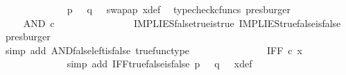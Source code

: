 \begin{isabellebody}
\ \ \ \ \ \ \ \ \ \ \ \ \isamarkupfalse%
\ {\isacartoucheopen}p\ {\isacharequal}{\kern0pt}\ {\isasymt}{\isacartoucheclose}\ {\isacartoucheopen}q\ {\isacharequal}{\kern0pt}\ {\isasymf}{\isacartoucheclose}\ swap{\isacharunderscore}{\kern0pt}ap\ x{\isacharunderscore}{\kern0pt}def\ \isamarkupfalse%
\ {\isacharparenleft}{\kern0pt}typecheck{\isacharunderscore}{\kern0pt}cfuncs{\isacharcomma}{\kern0pt}\ presburger{\isacharparenright}{\kern0pt}\isanewline
\ \ \ \ \ \ \ \ \ \ \isamarkupfalse%
\ \isamarkupfalse%
\ {\isachardoublequoteopen}{\isachardot}{\kern0pt}{\isachardot}{\kern0pt}{\isachardot}{\kern0pt}\ {\isacharequal}{\kern0pt}\ AND\ {\isasymcirc}\isactrlsub c\ {\isasymlangle}{\isasymf}{\isacharcomma}{\kern0pt}\ {\isasymt}{\isasymrangle}{\isachardoublequoteclose}\isanewline
\ \ \ \ \ \ \ \ \ \ \ \ \isamarkupfalse%
\ IMPLIES{\isacharunderscore}{\kern0pt}false{\isacharunderscore}{\kern0pt}true{\isacharunderscore}{\kern0pt}is{\isacharunderscore}{\kern0pt}true\ IMPLIES{\isacharunderscore}{\kern0pt}true{\isacharunderscore}{\kern0pt}false{\isacharunderscore}{\kern0pt}is{\isacharunderscore}{\kern0pt}false\ \isamarkupfalse%
\ presburger\isanewline
\ \ \ \ \ \ \ \ \ \ \isamarkupfalse%
\ \isamarkupfalse%
\ {\isachardoublequoteopen}{\isachardot}{\kern0pt}{\isachardot}{\kern0pt}{\isachardot}{\kern0pt}\ {\isacharequal}{\kern0pt}\ {\isasymf}{\isachardoublequoteclose}\isanewline
\ \ \ \ \ \ \ \ \ \ \ \ \isamarkupfalse%
\ {\isacharparenleft}{\kern0pt}simp\ add{\isacharcolon}{\kern0pt}\ AND{\isacharunderscore}{\kern0pt}false{\isacharunderscore}{\kern0pt}left{\isacharunderscore}{\kern0pt}is{\isacharunderscore}{\kern0pt}false\ true{\isacharunderscore}{\kern0pt}func{\isacharunderscore}{\kern0pt}type{\isacharparenright}{\kern0pt}\isanewline
\ \ \ \ \ \ \ \ \ \ \isamarkupfalse%
\ \isamarkupfalse%
\ {\isachardoublequoteopen}{\isachardot}{\kern0pt}{\isachardot}{\kern0pt}{\isachardot}{\kern0pt}\ {\isacharequal}{\kern0pt}\ IFF\ {\isasymcirc}\isactrlsub c\ x{\isachardoublequoteclose}\isanewline
\ \ \ \ \ \ \ \ \ \ \ \ \isamarkupfalse%
\ {\isacharparenleft}{\kern0pt}simp\ add{\isacharcolon}{\kern0pt}\ IFF{\isacharunderscore}{\kern0pt}true{\isacharunderscore}{\kern0pt}false{\isacharunderscore}{\kern0pt}is{\isacharunderscore}{\kern0pt}false\ {\isacartoucheopen}p\ {\isacharequal}{\kern0pt}\ {\isasymt}{\isacartoucheclose}\ {\isacartoucheopen}q\ {\isacharequal}{\kern0pt}\ {\isasymf}{\isacartoucheclose}\ x{\isacharunderscore}{\kern0pt}def{\isacharparenright}{\kern0pt}\isanewline

\end{isabellebody}
